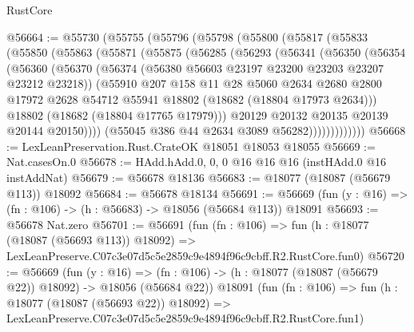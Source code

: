 \begin{lexlean}{RustCore}
\begin{coremodule}
@56664 := @55730
    (@55755
      (@55796
        (@55798
          (@55800
            (@55817
              (@55833
                (@55850
                  (@55863
                    (@55871
                      (@55875
                        (@56285
                          (@56293
                            (@56341
                              (@56350
                                (@56354
                                  (@56360
                                    (@56370
                                      (@56374
                                        (@56380 @56603 @23197 @23200 @23203 @23207 @23212 @23218))
                                      (@55910
                                        @207
                                        @158
                                        @11
                                        @28
                                        @5060
                                        @2634
                                        @2680
                                        @2800
                                        @17972
                                        @2628
                                        @54712
                                        @55941
                                        @18802
                                        (@18682 (@18804 @17973 @2634)))
                                      @18802
                                      (@18682 (@18804 @17765 @17979)))
                                    @20129
                                    @20132
                                    @20135
                                    @20139
                                    @20144
                                    @20150))))
                            (@55045 @386 @44 @2634 @3089 @56282)))))))))))))
@56668 := LexLeanPreservation.Rust.CrateOK @18051 @18053 @18055
@56669 := Nat.casesOn.{0}
@56678 := HAdd.hAdd.{0, 0, 0} @16 @16 @16 (instHAdd.{0} @16 instAddNat)
@56679 := @56678 @18136
@56683 := @18077 (@18087 (@56679 @113)) @18092
@56684 := @56678 @18134
@56691 := @56669 (fun (y : @16) => (fn : @106) -> (h : @56683) -> @18056 (@56684 @113)) @18091
@56693 := @56678 Nat.zero
@56701 := @56691
    (fun (fn : @106) =>
    fun (h : @18077 (@18087 (@56693 @113)) @18092) =>
    LexLeanPreserve.C07c3e07d5c5e2859c9e4894f96c9cbff.R2.RustCore.fun0)
@56720 := @56669
    (fun (y : @16) =>
    (fn : @106) -> (h : @18077 (@18087 (@56679 @22)) @18092) -> @18056 (@56684 @22))
    @18091
    (fun (fn : @106) =>
    fun (h : @18077 (@18087 (@56693 @22)) @18092) =>
    LexLeanPreserve.C07c3e07d5c5e2859c9e4894f96c9cbff.R2.RustCore.fun1)

\end{coremodule}
\end{lexlean}
